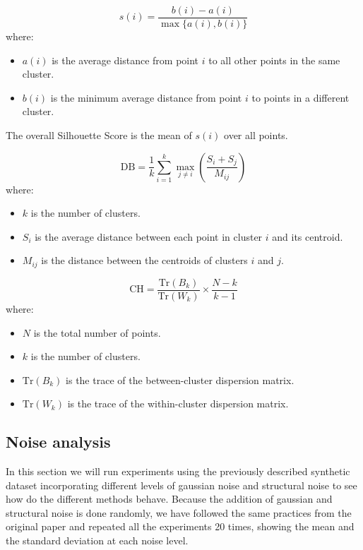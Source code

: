 \documentclass[
	10pt,
	parskip=half-,	
	paper=a4,
	english
	]{scrartcl}
\begin{document}
\begin{equation}
    s(i) = \frac{b(i) - a(i)}{\max\{a(i), b(i)\}}
    \label{eq11}
\end{equation}
where:
\begin{itemize}
    \item $a(i)$ is the average distance from point $i$ to all other points in the same cluster.
    \item $b(i)$ is the minimum average distance from point $i$ to points in a different cluster.
\end{itemize}
The overall Silhouette Score is the mean of $s(i)$ over all points.

\begin{equation}
    \text{DB} = \frac{1}{k} \sum_{i=1}^{k} \max_{j \neq i} \left( \frac{S_i + S_j}{M_{ij}} \right)
    \label{eq12}
\end{equation}
where:
\begin{itemize}
    \item $k$ is the number of clusters.
    \item $S_i$ is the average distance between each point in cluster $i$ and its centroid.
    \item $M_{ij}$ is the distance between the centroids of clusters $i$ and $j$.
\end{itemize}

\begin{equation}
    \text{CH} = \frac{\text{Tr}(B_k)}{\text{Tr}(W_k)} \times \frac{N - k}{k-1}
    \label{eq13}
\end{equation}
where:
\begin{itemize}
    \item $N$ is the total number of points.
    \item $k$ is the number of clusters.
    \item $\text{Tr}(B_k)$ is the trace of the between-cluster dispersion matrix.
    \item $\text{Tr}(W_k)$ is the trace of the within-cluster dispersion matrix.
\end{itemize}

\subsection{Noise analysis}

In this section we will run experiments using the previously described synthetic dataset incorporating different levels of gaussian noise and structural noise to see how do the different methods behave. Because the addition of gaussian and structural noise is done randomly, we have followed the same practices from the original paper and repeated all the experiments 20 times, showing the mean and the standard deviation at each noise level.
\end{document}
